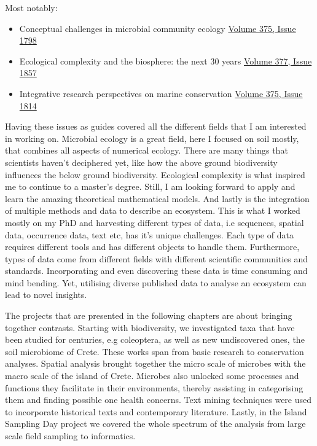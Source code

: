 \documentclass[
11pt, %
english, %
singlespacing, %
liststotoc, %
toctotoc, %
headsepline, %
]{MastersDoctoralThesis} %
\begin{document}
Most notably:

\begin{itemize}
    \item Conceptual challenges in microbial community ecology \href{https://doi.org/10.1098/rstb.2019.0241}{Volume 375, Issue 1798}
    \item Ecological complexity and the biosphere: the next 30 years \href{https://doi.org/10.1098/rstb.2021.0376}{Volume 377, Issue 1857}
    \item Integrative research perspectives on marine conservation \href{https://doi.org/10.1098/rstb.2019.0444}{Volume 375, Issue 1814}
\end{itemize}

Having these issues as guides covered all the different fields that I am interested 
in working on. Microbial ecology is a great field, here I focused on soil mostly, that
combines all aspects of numerical ecology. There are many things that scientists 
haven't deciphered yet, like how the above ground biodiversity influences the below
ground biodiversity. Ecological complexity is what inspired me to continue to a 
master's degree. Still, I am looking forward to apply and learn the amazing 
theoretical mathematical models. And lastly is the integration of multiple methods 
and data to describe an ecosystem. This is what I worked mostly on my PhD and 
harvesting different types of data, i.e sequences, spatial data, occurrence data, 
text etc, has it's unique challenges. Each type of data requires different tools and has 
different objects to handle them. Furthermore, types of data come from different 
fields with different scientific communities and standards. Incorporating and even 
discovering these data is time consuming and mind bending. Yet, utilising diverse 
published data to analyse an ecosystem can lead to novel insights. 

The projects that are presented in the following chapters are about 
bringing together contrasts. Starting with biodiversity, we investigated taxa that 
have been studied for centuries, e.g coleoptera, as well as new undiscovered ones, the soil microbiome of 
Crete. These works span from basic research to conservation analyses. 
Spatial analysis brought together the micro scale of microbes with the macro
scale of the island of Crete.
Microbes also unlocked some processes and functions they facilitate in their environments, thereby assisting in
categorising them and finding possible one health concerns.
Text mining techniques were used to incorporate historical texts and contemporary literature.
Lastly, in the Island Sampling Day project we covered
the whole spectrum of the analysis from large scale field sampling to informatics.
\end{document}
